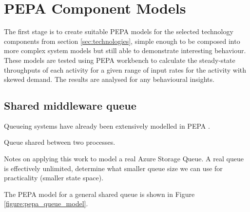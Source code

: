 %
%

\section{PEPA Component Models}\label{sec:pepa-component-models}

The first stage is to create suitable PEPA models for the selected technology components from section \ref{sec:technologies}, simple enough to be composed into more complex system models but still able to demonstrate interesting behaviour.  These models are tested using PEPA workbench \cite{RN51} to calculate the steady-state throughputs of each activity for a given range of input rates for the activity with skewed demand.  The results are analysed for any behavioural insights.

%
%
\FloatBarrier
\subsection{Shared middleware queue}

\begin{shaded}
Queueing systems have already been extensively modelled in PEPA \cite{RN75}.

Queue shared between two processes.

Notes on applying this work to model a real Azure Storage Queue.  A real queue is effectively unlimited, determine what smaller queue size we can use for practicality (smaller state space). 

The PEPA model for a general shared queue is shown in Figure \ref{figure:pepa_queue_model}.
\end{shaded}

